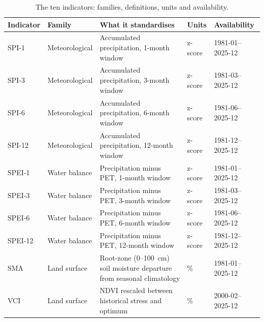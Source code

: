 \documentclass[10pt,a4paper]{article}
\begin{document}
\begin{table}[t]
\caption{The ten indicators: families, definitions, units and availability.}
\label{tab:indicators}
\small
\begin{tabularx}{\textwidth}{@{}l l X l l@{}}
\toprule
Indicator & Family & What it standardises & Units & Availability \\
\midrule
SPI-1 & Meteorological & Accumulated precipitation, 1-month window & z-score & 1981-01--2025-12 \\
SPI-3 & Meteorological & Accumulated precipitation, 3-month window & z-score & 1981-03--2025-12 \\
SPI-6 & Meteorological & Accumulated precipitation, 6-month window & z-score & 1981-06--2025-12 \\
SPI-12 & Meteorological & Accumulated precipitation, 12-month window & z-score & 1981-12--2025-12 \\
SPEI-1 & Water balance & Precipitation minus PET, 1-month window & z-score & 1981-01--2025-12 \\
SPEI-3 & Water balance & Precipitation minus PET, 3-month window & z-score & 1981-03--2025-12 \\
SPEI-6 & Water balance & Precipitation minus PET, 6-month window & z-score & 1981-06--2025-12 \\
SPEI-12 & Water balance & Precipitation minus PET, 12-month window & z-score & 1981-12--2025-12 \\
SMA & Land surface & Root-zone (0--100~cm) soil moisture departure from seasonal climatology & \% & 1981-01--2025-12 \\
VCI & Land surface & NDVI rescaled between historical stress and optimum & \% & 2000-02--2025-12 \\
\bottomrule
\end{tabularx}
\end{table}
\end{document}
